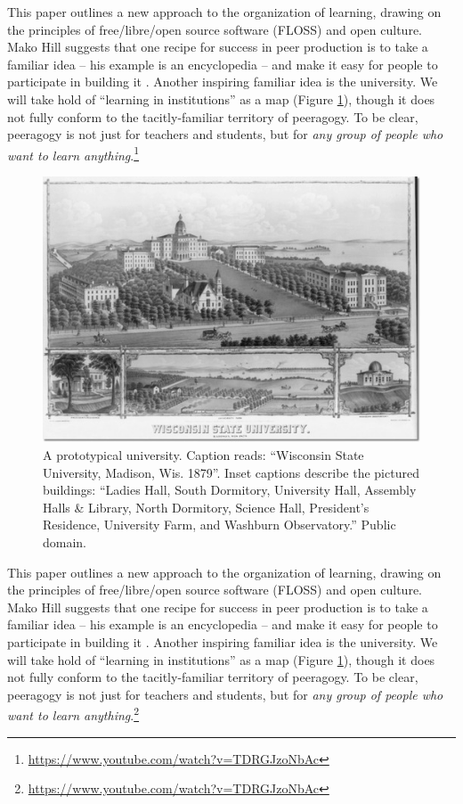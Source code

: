 This paper outlines a new approach to the organization of learning, drawing on the principles of free/libre/open source software (FLOSS) and open culture.  Mako Hill suggests that one recipe for success in peer production is to take a familiar idea -- his example is an encyclopedia -- and make it easy for people to participate in building it \cite[Chapter 1]{mako-thesis}.  Another inspiring familiar idea is the university.  We will take hold of ``learning in institutions'' as a map (Figure \ref{madison-map}), though it does not fully conform to the tacitly-familiar territory of peeragogy.  To be clear, peeragogy is not just for teachers and students, but for \emph{any group of people who want to learn anything}.\footnote{\url{https://www.youtube.com/watch?v=TDRGJzoNbAc}}

\begin{figure}
\vspace{-.9cm}
\begin{center}
\includegraphics[width=.5\textwidth,trim=0 30 10 2, clip=true]{wisconsin-map}
\end{center}
\vspace{-.1cm}
\caption{A prototypical university.  Caption reads: ``Wisconsin State
  University, Madison, Wis. 1879''.  Inset captions describe the
  pictured buildings: ``Ladies Hall, South Dormitory, University Hall,
  Assembly Halls \& Library, North Dormitory, Science Hall, President's
  Residence, University Farm, and Washburn Observatory.''  Public
  domain.\label{madison-map}}
\vspace{-.6cm}
\end{figure}

This paper outlines a new approach to the organization of learning, drawing on the principles of free/libre/open source software (FLOSS) and open culture.  Mako Hill suggests that one recipe for success in peer production is to take a familiar idea -- his example is an encyclopedia -- and make it easy for people to participate in building it \cite[Chapter 1]{mako-thesis}.  Another inspiring familiar idea is the university.  We will take hold of ``learning in institutions'' as a map (Figure \ref{madison-map}), though it does not fully conform to the tacitly-familiar territory of peeragogy.  To be clear, peeragogy is not just for teachers and students, but for \emph{any group of people who want to learn anything}.\footnote{\url{https://www.youtube.com/watch?v=TDRGJzoNbAc}}

